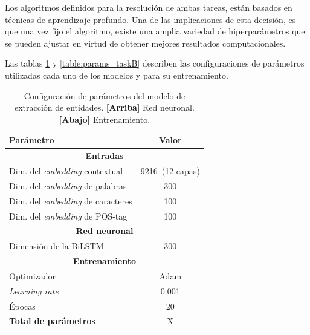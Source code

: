 Los algoritmos definidos para la resolución de ambas tareas, están basados en técnicas de aprendizaje profundo.
Una de las implicaciones de esta decisión, es que una vez fijo el algoritmo, existe una amplia variedad de hiperparámetros que se pueden ajustar en virtud de obtener mejores resultados computacionales.

Las tablas \ref{table:params_taskA} y \ref{table:params_taskB} describen las configuraciones de parámetros utilizadas cada uno de los modelos y para su entrenamiento.

\begin{table}[tb]\centering
		\begin{tabular}{lc}
			\hline
			\textbf{Parámetro} & \textbf{Valor} \\
			\hline
			\hline
			\multicolumn{2}{c}{\textbf{Entradas}}\\
			\hline
			\hline
			Dim. del \textit{embedding} contextual & 9216~(12 capas)\\
			Dim. del \textit{embedding} de palabras & 300\\
			Dim. del \textit{embedding} de caracteres & 100\\
			Dim. del \textit{embedding} de POS-tag & 100\\
			
			\hline
			\hline
			\multicolumn{2}{c}{\textbf{Red neuronal}}\\
			\hline
			\hline
			
			Dimensión de la BiLSTM & 300\\
			
			\hline
			\hline
			\multicolumn{2}{c}{\textbf{Entrenamiento}}\\
			\hline
			\hline
			
			Optimizador & Adam\\
			\textit{Learning rate} & 0.001\\
			Épocas & 20\\
			
			\hline
			\hline
			
			\textbf{Total de parámetros} & X\\
			
			\hline
			
		\end{tabular}
	
	\caption{Configuración de parámetros del modelo de extracción de entidades. \textbf{[Arriba]} Red neuronal. \textbf{[Abajo]} Entrenamiento.}\label{table:params_taskA}
	
\end{table}


